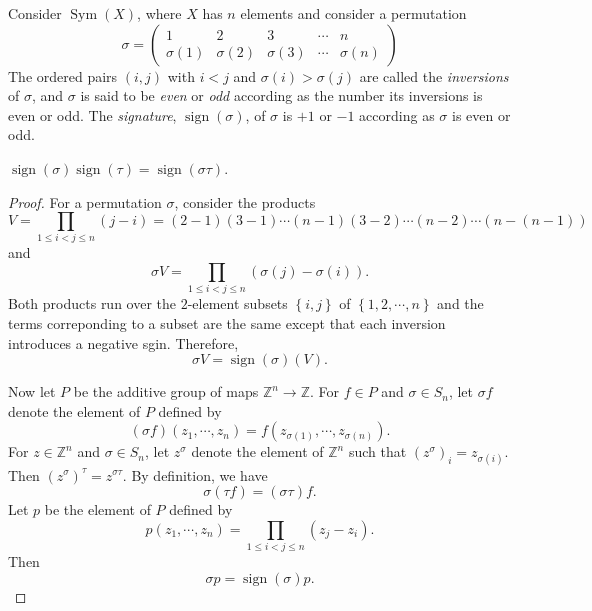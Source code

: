 \begin{definition}
  \label{definition-even-permutation}
  \label{definition-odd-permutation}
  \label{definition-permutation-signature}
  \label{definition-permutation-inversions}
  Consider \( \operatorname{Sym}(X) \), where \( X \) has \( n \) elements and consider a permutation
  \[
    \sigma = \begin{pmatrix}
      1 & 2 & 3 &\cdots &n\\
      \sigma(1) & \sigma(2) & \sigma(3) &\cdots & \sigma(n)
    \end{pmatrix}
  \]
  The ordered pairs \( (i, j) \) with \( i < j \) and \( \sigma(i) > \sigma(j) \) are called the \emph{inversions} of \( \sigma \), and \( \sigma \) is said to be \emph{even} or \emph{odd} according as the number its inversions is even or odd.
  The \emph{signature}, \( \operatorname{sign}(\sigma) \), of \( \sigma \) is \( + 1 \) or \( -1 \) according as \( \sigma \) is even or odd.
\end{definition}

\begin{proposition}
  \label{proposition-signature-as-homomorphism}
  \( \operatorname{sign}(\sigma) \operatorname{sign}(\tau) = \operatorname{sign}(\sigma \tau) \).
\end{proposition}
\begin{proof}
  For a permutation \( \sigma \), consider the products
  \[
    V = \prod_{1 \leq i < j \leq n} (j - i) = (2 - 1)(3 - 1) \cdots (n - 1)(3 - 2) \cdots (n - 2) \cdots (n - (n - 1))
  \]
  and
  \[
    \sigma V = \prod_{1 \leq i < j \leq n}(\sigma(j) - \sigma(i)).
  \]
  Both products run over the \( 2 \)-element subsets \( \left\lbrace i, j \right\rbrace \) of \( \left\lbrace 1, 2, \cdots, n \right\rbrace \) and the terms correponding to a subset are the same except that each inversion introduces a negative sgin.
  Therefore,
  \[
    \sigma V = \operatorname{sign}(\sigma)(V).
  \]

  Now let \( P \) be the additive group of maps \( \mathbb{Z}^n \to \mathbb{Z} \).
  For \( f \in P \) and \( \sigma \in S_n \), let \( \sigma f \) denote the element of \( P \) defined by
  \[
    (\sigma f)(z_1, \cdots, z_n) = f(z_{\sigma(1)}, \cdots, z_{\sigma(n)}).
  \]
  For \( z \in \mathbb{Z}^n \) and \( \sigma \in S_n \), let \( z^\sigma \) denote the element of \( \mathbb{Z}^n \) such that \( (z^\sigma)_i = z_{\sigma(i)} \).
  Then \( (z^\sigma)^\tau = z^{\sigma \tau} \).
  By definition, we have
  \[
    \sigma(\tau f) = (\sigma \tau)f.
  \]
  Let \( p \) be the element of \( P \) defined by
  \[
    p(z_1, \cdots, z_n) = \prod_{1 \leq i < j \leq n}(z_j - z_i).
  \]
  Then
  \[
    \sigma p = \operatorname{sign}(\sigma) p.
  \]
\end{proof}

